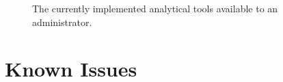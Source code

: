 \begin{figure}[h!]
	\centering
	\caption{The currently implemented analytical tools available to an administrator.}
	\label{fig:screens-analytics-list}
\end{figure}

\section{Known Issues}
